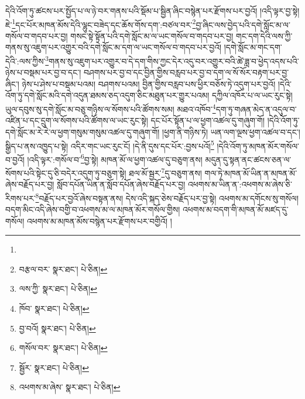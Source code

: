 དེའི་འོག་ཏུ་ཚངས་པར་སྤྱོད་པ་ལ་ཉེ་བར་གནས་པའི་སྡོམ་པ་སྦྱིན་ཞིང་བསྙེན་པར་རྫོགས་པར་བྱའོ། །འདི་ལྟར་བྱ་སྟེ། ཇེ་\footnote{}དང་པོར་མཁན་མོས་དེའི་ལྷུང་བཟེད་དང་ཆོས་གོས་དག་:བཙལ་བར་\footnote{བརྩལ་བར་  སྣར་ཐང་།  པེ་ཅིན། }བྱ་ཞིང་ལས་བྱེད་པའི་དགེ་སློང་མ་ལ་གསོལ་བ་གདབ་པར་བྱ། གསང་སྟེ་སྟོན་པའི་དགེ་སློང་མ་ལ་ཡང་གསོལ་བ་གདབ་པར་བྱ། གང་དག་དེའི་ལས་ཀྱི་གནས་སུ་འཇུག་པར་འགྱུར་བའི་དགེ་སློང་མ་དག་ལ་ཡང་གསོལ་བ་གདབ་པར་བྱའོ། །དགེ་སློང་མ་གང་དག་དེའི་:ལས་ཀྱིས་\footnote{ལས་ཀྱི་  སྣར་ཐང་།  པེ་ཅིན། }གནས་སུ་འཇུག་པར་འགྱུར་བ་དེ་དག་གིས་ཀྱང་དེར་འདུ་བར་འགྱུར་བའི་ཚེ་ཟླ་བ་ཕྱེད་འདས་པའི་ཉེས་པ་བསྡམ་པར་བྱ་བ་དང་། བཤགས་པར་བྱ་བ་དང་བྱིན་གྱིས་བརླབ་པར་བྱ་བ་དག་ལ་སོ་སོར་བརྟག་པར་བྱ་ཞིང་། ཉེས་པ་ཤེས་པ་བསྡམ་པའམ། བཤགས་པའམ། བྱིན་གྱིས་བརླབ་པས་ཕྱིར་བཅོས་ཏེ་འདུག་པར་བྱའོ། །དེའི་འོག་ཏུ་དགེ་སློང་མའི་དགེ་འདུན་ཐམས་ཅད་འདུག་ཅིང་མཐུན་པར་གྱུར་པའམ། དཀྱིལ་འཁོར་པ་ལ་ཡང་རུང་སྟེ། ཡུལ་དབུས་སུ་དགེ་སློང་མ་བཅུ་གཉིས་ལ་སོགས་པའི་ཚོགས་སམ། མཐའ་འཁོབ་\footnote{ཁོབ་  སྣར་ཐང་།  པེ་ཅིན། }དག་ཏུ་གཞན་མེད་ན་འདུལ་བ་འཛིན་པ་དང་དྲུག་ལ་སོགས་པའི་ཚོགས་ལ་ཡང་རུང་སྟེ། དང་པོར་སྟོན་པ་ལ་ཕྱག་འཚལ་དུ་གཞུག་གོ། །དེའི་འོག་ཏུ་དགེ་སློང་མ་རེ་རེ་ལ་ཕྱག་གསུམ་གསུམ་འཚལ་དུ་གཞུག་གོ། །ཕྱག་ནི་གཉིས་ཏེ། ཡན་ལག་ལྔས་ཕྱག་འཚལ་བ་དང་། སྒྱིད་པ་ནས་འཁྱུད་པ་སྟེ། འདིར་གང་ཡང་རུང་ངོ། །དེ་ནི་དུས་དང་པོར་:བྱས་པའོ།\footnote{བྱ་བའོ།  སྣར་ཐང་།  པེ་ཅིན། } །དེའི་འོག་ཏུ་མཁན་མོར་གསོལ་བ་བྱའོ། །འདི་ལྟར་:གསོལ་བ་\footnote{གསོལ་བར་  སྣར་ཐང་།  པེ་ཅིན། }བྱ་སྟེ། མཁན་མོ་ལ་ཕྱག་འཚལ་དུ་བཅུག་ནས། མདུན་དུ་སྟན་ནང་ཚངས་ཅན་ལ་སོགས་པའི་སྟེང་དུ་ཅི་བདེར་འདུག་ཏུ་བཅུག་སྟེ། ཐལ་མོ་སྦྱར་\footnote{སྦྱོར་  སྣར་ཐང་།  པེ་ཅིན། }དུ་བཅུག་ནས། གལ་ཏེ་མཁན་མོ་ཡིན་ན་མཁན་མོ་ཞེས་བརྗོད་པར་བྱ། སློབ་དཔོན་ཡིན་ན་སློབ་དཔོན་ཞེས་བརྗོད་པར་བྱ། འཕགས་མ་ཡིན་ན་:འཕགས་མ་ཞེས་ཅི་རིགས་པར་\footnote{འཕགས་མ་ཞེས་  སྣར་ཐང་།  པེ་ཅིན། }བརྗོད་པར་བྱའོ་ཞེས་བསྟན་ནས། དེས་འདི་སྐད་ཅེས་བརྗོད་པར་བྱ་སྟེ། འཕགས་མ་དགོངས་སུ་གསོལ། བདག་མིང་འདི་ཞེས་བགྱི་བ་འཕགས་མ་ལ་མཁན་མོར་གསོལ་གྱིས། འཕགས་མ་བདག་གི་མཁན་མོ་མཛད་དུ་གསོལ། འཕགས་མ་མཁན་མོས་བསྙེན་པར་རྫོགས་པར་བགྱིའོ། །
